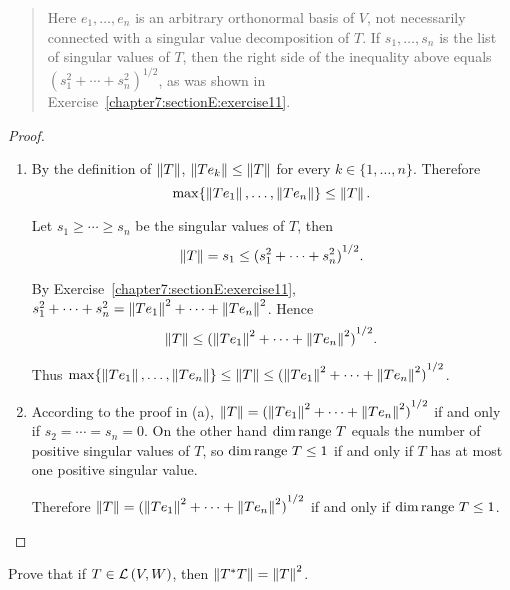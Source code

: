 \begin{quote}
    Here $e_{1}, \ldots, e_{n}$ is an arbitrary orthonormal basis of $V$, not necessarily connected with a singular value decomposition of $T$. If $s_{1}, \ldots, s_{n}$ is the list of singular values of $T$, then the right side of the inequality above equals ${(s_{1}^{2} + \cdots + s_{n}^{2})}^{1/2}$, as was shown in Exercise~\ref{chapter7:sectionE:exercise11}.
\end{quote}

\begin{proof}
    \begin{enumerate}[label={(\alph*)}]
        \item By the definition of $\left\Vert{T}\right\Vert$, $\left\Vert{Te_{k}}\right\Vert\leq \left\Vert{T}\right\Vert$ for every $k\in\{1,\ldots,n\}$. Therefore
              \[
                  \max\{ \left\Vert{Te_{1}}\right\Vert, \ldots, \left\Vert{Te_{n}}\right\Vert \}\leq \left\Vert{T}\right\Vert.
              \]

              Let $s_{1} \geq \cdots \geq s_{n}$ be the singular values of $T$, then
              \[
                  \left\Vert{T}\right\Vert = s_{1}\leq {(s_{1}^{2} + \cdots + s_{n}^{2})}^{1/2}.
              \]

              By Exercise~\ref{chapter7:sectionE:exercise11}, $s_{1}^{2} + \cdots + s_{n}^{2} = \left\Vert{Te_{1}}\right\Vert^{2} + \cdots + \left\Vert{Te_{n}}\right\Vert^{2}$. Hence
              \[
                  \left\Vert{T}\right\Vert\leq {(\left\Vert{Te_{1}}\right\Vert^{2} + \cdots + \left\Vert{Te_{n}}\right\Vert^{2})}^{1/2}.
              \]

              Thus $\max\{ \left\Vert{Te_{1}}\right\Vert, \ldots, \left\Vert{Te_{n}}\right\Vert \}\leq \left\Vert{T}\right\Vert \leq {(\left\Vert{Te_{1}}\right\Vert^{2} + \cdots + \left\Vert{Te_{n}}\right\Vert^{2})}^{1/2}$.
        \item According to the proof in (a), $\left\Vert{T}\right\Vert = {(\left\Vert{Te_{1}}\right\Vert^{2} + \cdots + \left\Vert{Te_{n}}\right\Vert^{2})}^{1/2}$ if and only if $s_{2} = \cdots = s_{n} = 0$. On the other hand $\dim\operatorname{range}\,{T}$ equals the number of positive singular values of $T$, so $\dim\operatorname{range}\,{T}\leq 1$ if and only if $T$ has at most one positive singular value.

              Therefore $\left\Vert{T}\right\Vert = {(\left\Vert{Te_{1}}\right\Vert^{2} + \cdots + \left\Vert{Te_{n}}\right\Vert^{2})}^{1/2}$ if and only if $\dim\operatorname{range}\,{T}\leq 1$.
    \end{enumerate}
\end{proof}
\newpage

\begin{exercise}
    Prove that if $T\in\mathcal{L}\left({V, W}\right)$, then $\left\Vert{T^{*}T}\right\Vert = \left\Vert{T}\right\Vert^{2}$.
\end{exercise}

